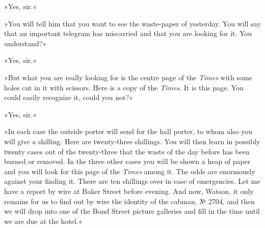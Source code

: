 »Yes, sir.«

»You will tell him that you want to see the waste-paper of yesterday. You will say that an important telegram has miscarried and that you are looking for it. You understand?«

»Yes, sir.«

»But what you are really looking for is the centre page of the \textit{Times} with some holes cut in it with scissors. Here is a copy of the \textit{Times}. It is this page. You could easily recognize it, could you not?«

»Yes, sir.«

»In each case the outside porter will send for the hall porter, to whom also you will give a shilling. Here are twenty-three shillings. You will then learn in possibly twenty cases out of the twenty-three that the waste of the day before has been burned or removed. In the three other cases you will be shown a heap of paper and you will look for this page of the \textit{Times} among it. The odds are enormously against your finding it. There are ten shillings over in case of emergencies. Let me have a report by wire at Baker Street before evening. And now, Watson, it only remains for us to find out by wire the identity of the cabman, № 2704, and then we will drop into one of the Bond Street picture galleries and fill in the time until we are due at the hotel.«
